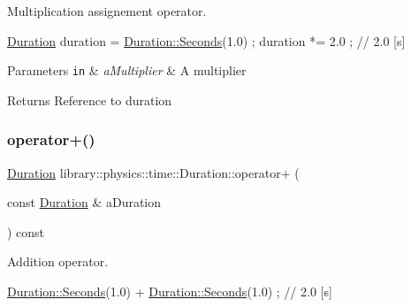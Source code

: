 Multiplication assignement operator. 


\begin{DoxyCode}
\hyperlink{classlibrary_1_1physics_1_1time_1_1_duration_a0a70efcf487a841da572afcf00001f64}{Duration} duration = \hyperlink{classlibrary_1_1physics_1_1time_1_1_duration_ae10891c94a1b2278c444cb44b37132f1}{Duration::Seconds}(1.0) ;
duration *= 2.0 ; \textcolor{comment}{// 2.0 [s]}
\end{DoxyCode}



\begin{DoxyParams}[1]{Parameters}
\mbox{\tt in}  & {\em a\+Multiplier} & A multiplier \\
\hline
\end{DoxyParams}
\begin{DoxyReturn}{Returns}
Reference to duration 
\end{DoxyReturn}
\mbox{\label{classlibrary_1_1physics_1_1time_1_1_duration_ae130ab9904fc08b9cf19b32510913350}} 
\subsubsection{\texorpdfstring{operator+()}{operator+()}\hspace{0.1cm}{\footnotesize\ttfamily [1/2]}}
{\footnotesize\ttfamily \hyperlink{classlibrary_1_1physics_1_1time_1_1_duration}{Duration} library\+::physics\+::time\+::\+Duration\+::operator+ (\begin{DoxyParamCaption}\item[{const \hyperlink{classlibrary_1_1physics_1_1time_1_1_duration}{Duration} \&}]{a\+Duration }\end{DoxyParamCaption}) const}



Addition operator. 


\begin{DoxyCode}
\hyperlink{classlibrary_1_1physics_1_1time_1_1_duration_ae10891c94a1b2278c444cb44b37132f1}{Duration::Seconds}(1.0) + \hyperlink{classlibrary_1_1physics_1_1time_1_1_duration_ae10891c94a1b2278c444cb44b37132f1}{Duration::Seconds}(1.0) ; \textcolor{comment}{// 2.0 [s]}
\end{DoxyCode}



